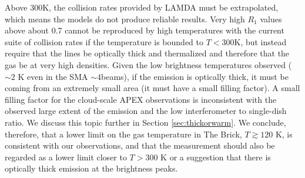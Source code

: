 Above 300K, the collision rates provided by LAMDA
\citep{Green1991a,Schoier2005a,Wiesenfeld2013a} must be extrapolated, which
means the models do not produce reliable results.  Very high $R_1$ values above
about 0.7 cannot be reproduced by high temperatures with the current suite of
collision rates if the temperature is bounded to $T<300$K, but instead require
that the lines be optically thick and thermalized and therefore that the gas be
at very high densities.   Given the low brightness temperatures observed
($\sim2$ K even in the SMA $\sim4$\arcsec beams), if the emission is optically
thick, it must be coming from an extremely small area (it must have a small
filling factor).  A small filling factor for the cloud-scale APEX observations
is inconsistent with the observed large extent of the emission and the low
interferometer to single-dish ratio.  We discuss this topic further in Section
\ref{sec:thickorwarm}.  We conclude, therefore, that a lower limit on the gas
temperature in The Brick, $T\gtrsim120$ K, is consistent with our observations,
and that the \citet{Johnston2014a} measurement should also be regarded as a
lower limit closer to $T>300$ K or a suggestion that there is optically thick
\para \threeohthree emission at the brightness peaks.



%

